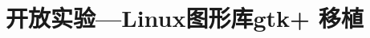 \documentclass[a4paper,11pt]{article}
\title{
    开放实验---Linux图形库gtk+ 移植
}
\author{}
\date{}
\begin{document}
\maketitle
\frenchspacing

\end{document}
